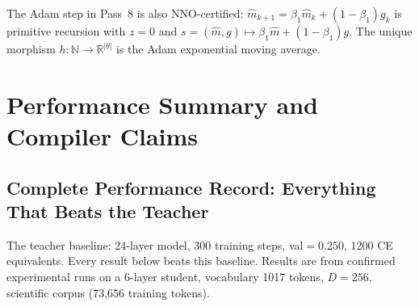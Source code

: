 \documentclass[11pt]{amsart}
\begin{document}
The Adam step in Pass~8 is also NNO-certified:
$\hat{m}_{k+1} = \beta_1 \hat{m}_k + (1-\beta_1) g_k$
is primitive recursion with $z = 0$ and $s = (\hat{m}, g) \mapsto \beta_1 \hat{m} + (1-\beta_1)g$.
The unique morphism $h: \mathbb{N} \to \mathbb{R}^{|\theta|}$
is the Adam exponential moving average.

\section{Performance Summary and Compiler Claims}

\subsection{Complete Performance Record: Everything That Beats the Teacher}

The teacher baseline: 24-layer model, 300 training steps, val${=}0.250$,
1200 CE equivalents. Every result below beats this baseline.
Results are from confirmed experimental runs on a 6-layer student,
vocabulary 1017 tokens, $D=256$, scientific corpus (73,656 training tokens).
\end{document}
